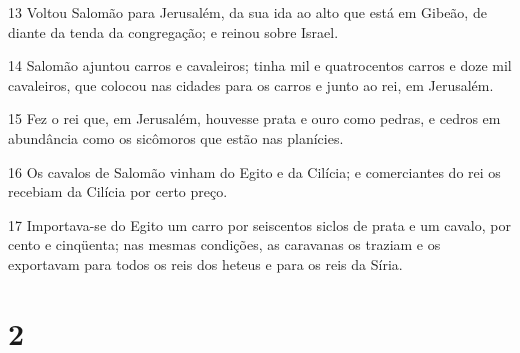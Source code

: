 \par 13 Voltou Salomão para Jerusalém, da sua ida ao alto que está em Gibeão, de diante da tenda da congregação; e reinou sobre Israel.
\par 14 Salomão ajuntou carros e cavaleiros; tinha mil e quatrocentos carros e doze mil cavaleiros, que colocou nas cidades para os carros e junto ao rei, em Jerusalém.
\par 15 Fez o rei que, em Jerusalém, houvesse prata e ouro como pedras, e cedros em abundância como os sicômoros que estão nas planícies.
\par 16 Os cavalos de Salomão vinham do Egito e da Cilícia; e comerciantes do rei os recebiam da Cilícia por certo preço.
\par 17 Importava-se do Egito um carro por seiscentos siclos de prata e um cavalo, por cento e cinqüenta; nas mesmas condições, as caravanas os traziam e os exportavam para todos os reis dos heteus e para os reis da Síria.

\chapter{2}


